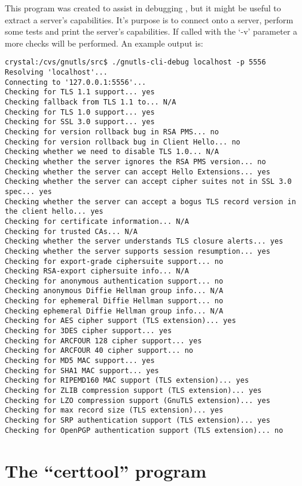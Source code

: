 This program was created to assist in debugging \gnutls{}, but it
might be useful to extract a \tls{} server's capabilities. 
It's purpose is to connect onto a \tls{} server, perform
some tests and print the server's capabilities. If called with the
`-v' parameter a more checks will be performed. An example output is:

\begin{verbatim}
crystal:/cvs/gnutls/src$ ./gnutls-cli-debug localhost -p 5556
Resolving 'localhost'...
Connecting to '127.0.0.1:5556'...
Checking for TLS 1.1 support... yes
Checking fallback from TLS 1.1 to... N/A
Checking for TLS 1.0 support... yes
Checking for SSL 3.0 support... yes
Checking for version rollback bug in RSA PMS... no
Checking for version rollback bug in Client Hello... no
Checking whether we need to disable TLS 1.0... N/A
Checking whether the server ignores the RSA PMS version... no
Checking whether the server can accept Hello Extensions... yes
Checking whether the server can accept cipher suites not in SSL 3.0 spec... yes
Checking whether the server can accept a bogus TLS record version in the client hello... yes
Checking for certificate information... N/A
Checking for trusted CAs... N/A
Checking whether the server understands TLS closure alerts... yes
Checking whether the server supports session resumption... yes
Checking for export-grade ciphersuite support... no
Checking RSA-export ciphersuite info... N/A
Checking for anonymous authentication support... no
Checking anonymous Diffie Hellman group info... N/A
Checking for ephemeral Diffie Hellman support... no
Checking ephemeral Diffie Hellman group info... N/A
Checking for AES cipher support (TLS extension)... yes
Checking for 3DES cipher support... yes
Checking for ARCFOUR 128 cipher support... yes
Checking for ARCFOUR 40 cipher support... no
Checking for MD5 MAC support... yes
Checking for SHA1 MAC support... yes
Checking for RIPEMD160 MAC support (TLS extension)... yes
Checking for ZLIB compression support (TLS extension)... yes
Checking for LZO compression support (GnuTLS extension)... yes
Checking for max record size (TLS extension)... yes
Checking for SRP authentication support (TLS extension)... yes
Checking for OpenPGP authentication support (TLS extension)... no

\end{verbatim}

\section{The ``certtool'' program}

